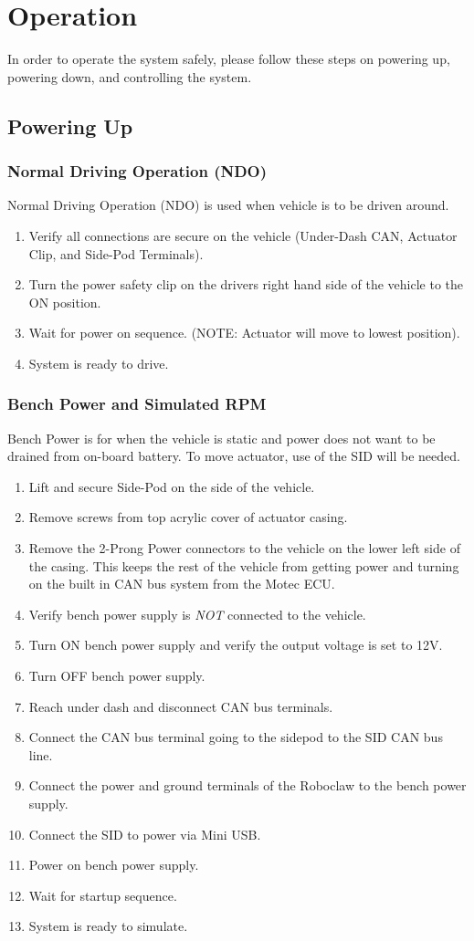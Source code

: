 \documentclass{article}
\begin{document}
\section{Operation}
In order to operate the system safely, please follow these steps on powering up, powering down, and controlling the system.
\subsection{Powering Up}
\subsubsection{Normal Driving Operation (NDO)}
Normal Driving Operation (NDO) is used when vehicle is to be driven around.
\begin{enumerate}
    \item Verify all connections are secure on the vehicle (Under-Dash CAN, Actuator Clip, and Side-Pod Terminals).
    \item Turn the power safety clip on the drivers right hand side of the vehicle to the ON position.
    \item Wait for power on sequence. (NOTE: Actuator will move to lowest position).
    \item System is ready to drive.
\end{enumerate}
\subsubsection{Bench Power and Simulated RPM}
Bench Power is for when the vehicle is static and power does not want to be drained from on-board battery. To move actuator, use of the SID will be needed.
\begin{enumerate}
    \item Lift and secure Side-Pod on the side of the vehicle.
    \item Remove screws from top acrylic cover of actuator casing.
    \item Remove the 2-Prong Power connectors to the vehicle on the lower left side of the casing. This keeps the rest of the vehicle from getting power and turning on the built in CAN bus system from the Motec ECU.
    \item Verify bench power supply is \textit{NOT} connected to the vehicle.
    \item Turn ON bench power supply and verify the output voltage is set to 12V.
    \item Turn OFF bench power supply.
    \item Reach under dash and disconnect CAN bus terminals.
    \item Connect the CAN bus terminal going to the sidepod to the SID CAN bus line.
    \item Connect the power and ground terminals of the Roboclaw to the bench power supply.
    \item Connect the SID to power via Mini USB.
    \item Power on bench power supply.
    \item Wait for startup sequence.
    \item System is ready to simulate.
\end{enumerate}
\end{document}
